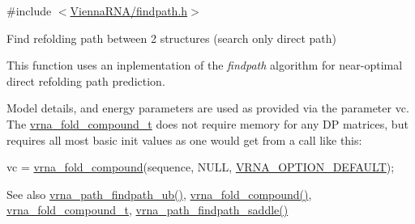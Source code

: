 {\ttfamily \#include $<$\hyperlink{findpath_8h}{Vienna\+R\+N\+A/findpath.\+h}$>$}



Find refolding path between 2 structures (search only direct path) 

This function uses an inplementation of the {\itshape findpath} algorithm \cite{flamm:2001} for near-\/optimal direct refolding path prediction.

Model details, and energy parameters are used as provided via the parameter \textquotesingle{}vc\textquotesingle{}. The \hyperlink{group__fold__compound_ga1b0cef17fd40466cef5968eaeeff6166}{vrna\+\_\+fold\+\_\+compound\+\_\+t} does not require memory for any DP matrices, but requires all most basic init values as one would get from a call like this\+: 
\begin{DoxyCode}
vc = \hyperlink{group__fold__compound_ga6601d994ba32b11511b36f68b08403be}{vrna\_fold\_compound}(sequence, NULL, \hyperlink{group__fold__compound_gacea5b7ee6181c485f36e2afa0e9089e4}{VRNA\_OPTION\_DEFAULT});
\end{DoxyCode}


\begin{DoxySeeAlso}{See also}
\hyperlink{group__direct__paths_ga8d47812616303f40057dfb033869863a}{vrna\+\_\+path\+\_\+findpath\+\_\+ub()}, \hyperlink{group__fold__compound_ga6601d994ba32b11511b36f68b08403be}{vrna\+\_\+fold\+\_\+compound()}, \hyperlink{group__fold__compound_ga1b0cef17fd40466cef5968eaeeff6166}{vrna\+\_\+fold\+\_\+compound\+\_\+t}, \hyperlink{group__direct__paths_gad611574a76593e26021f177e7854b6b4}{vrna\+\_\+path\+\_\+findpath\+\_\+saddle()}
\end{DoxySeeAlso}

